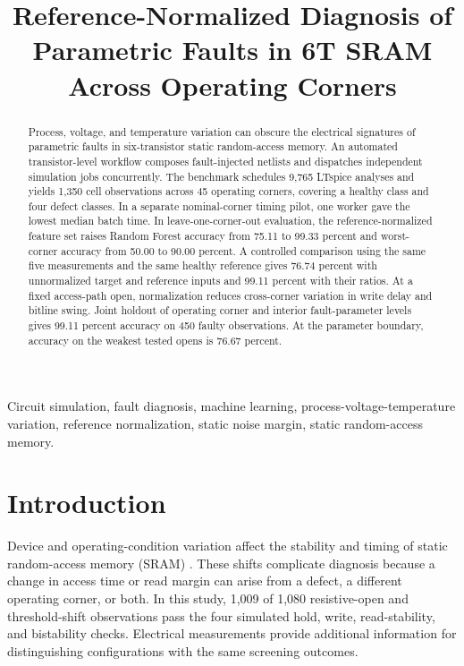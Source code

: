 \documentclass[conference,letterpaper]{IEEEtran}
\begin{document}
\title{Reference-Normalized Diagnosis of Parametric Faults in 6T SRAM Across Operating Corners}
\author{}
\maketitle

\begin{abstract}
Process, voltage, and temperature variation can obscure the electrical signatures of parametric faults in six-transistor static random-access memory. An automated transistor-level workflow composes fault-injected netlists and dispatches independent simulation jobs concurrently. The benchmark schedules 9,765 LTspice analyses and yields 1,350 cell observations across 45 operating corners, covering a healthy class and four defect classes. In a separate nominal-corner timing pilot, one worker gave the lowest median batch time. In leave-one-corner-out evaluation, the reference-normalized feature set raises Random Forest accuracy from 75.11 to 99.33 percent and worst-corner accuracy from 50.00 to 90.00 percent. A controlled comparison using the same five measurements and the same healthy reference gives 76.74 percent with unnormalized target and reference inputs and 99.11 percent with their ratios. At a fixed access-path open, normalization reduces cross-corner variation in write delay and bitline swing. Joint holdout of operating corner and interior fault-parameter levels gives 99.11 percent accuracy on 450 faulty observations. At the parameter boundary, accuracy on the weakest tested opens is 76.67 percent.
\end{abstract}

\begin{IEEEkeywords}
Circuit simulation, fault diagnosis, machine learning, process-voltage-temperature variation, reference normalization, static noise margin, static random-access memory.
\end{IEEEkeywords}

\section{Introduction}

Device and operating-condition variation affect the stability and timing of static random-access memory (SRAM) \cite{mukhopadhyay2005modeling,mukhopadhyay2007memories}. These shifts complicate diagnosis because a change in access time or read margin can arise from a defect, a different operating corner, or both. In this study, 1,009 of 1,080 resistive-open and threshold-shift observations pass the four simulated hold, write, read-stability, and bistability checks. Electrical measurements provide additional information for distinguishing configurations with the same screening outcomes.
\end{document}
